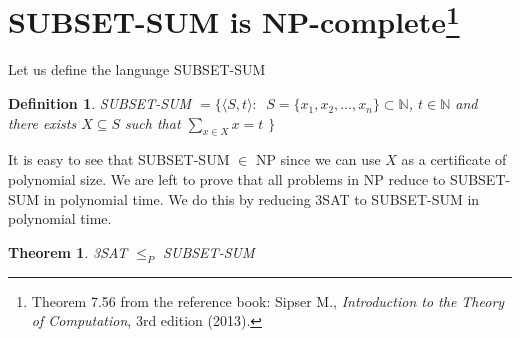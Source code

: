 \documentclass{article}
\newcommand{\theoremname}{Theorem}
\newcommand{\definitionname}{Definition}
\newtheorem{theorem}{\theoremname}
\newtheorem{definition}{\definitionname}
\newcommand{\st}{\colon\,}
\newcommand{\N}{\mathbb{N}}
\begin{document}
\section{\texorpdfstring{SUBSET-SUM is NP-complete\footnote{%
Theorem 7.56 from the reference book: Sipser M.,
\emph{Introduction to the Theory of Computation}, 3rd edition
(2013).}}{SUBSET-SUM is NP-complete}}
Let us define the language SUBSET-SUM
\begin{definition}
	SUBSET-SUM \(= \{\langle S, t\rangle \st\)
	\(S = \{x_1,x_2,\ldots,x_n\} \subset \N\),
	\(t \in \N\) and there exists \(X \subseteq S\) such that
	\(\sum_{x \in X} x = t\)
	\(\}\)
\end{definition}
It is easy to see that SUBSET-SUM \(\in\) NP since we can use \(X\) as a
certificate of polynomial size.
We are left to prove that all problems in NP reduce to SUBSET-SUM in polynomial
time. We do this by reducing 3SAT to SUBSET-SUM in polynomial time.
\begin{theorem}
	3SAT \(\le_P\) SUBSET-SUM
\end{theorem}
\end{document}
